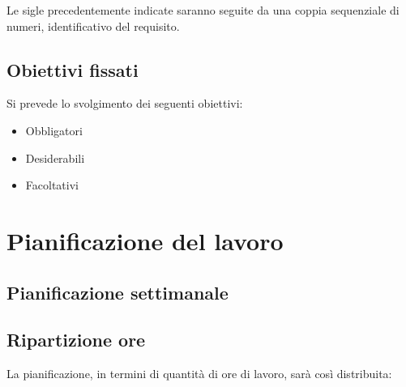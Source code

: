 Le sigle precedentemente indicate saranno seguite da una coppia sequenziale di numeri, identificativo del requisito.

\subsection*{Obiettivi fissati}
Si prevede lo svolgimento dei seguenti obiettivi:
\begin{itemize}
	\item Obbligatori
	\begin{itemize}
		\obiettiviObbligatori
	\end{itemize}
	
	\item Desiderabili 
	\begin{itemize}
		\obiettiviDesiderabili
	\end{itemize}
	
	\item Facoltativi
	\begin{itemize}
		\obiettiviFacoltativi
	\end{itemize} 
\end{itemize}


\section{Pianificazione del lavoro}

\subsection*{Pianificazione settimanale}
\prospettoSettimanale

\subsection*{Ripartizione ore}
La pianificazione, in termini di quantità di ore di lavoro, sarà così distribuita:
\begin{center}
    
\end{center}
